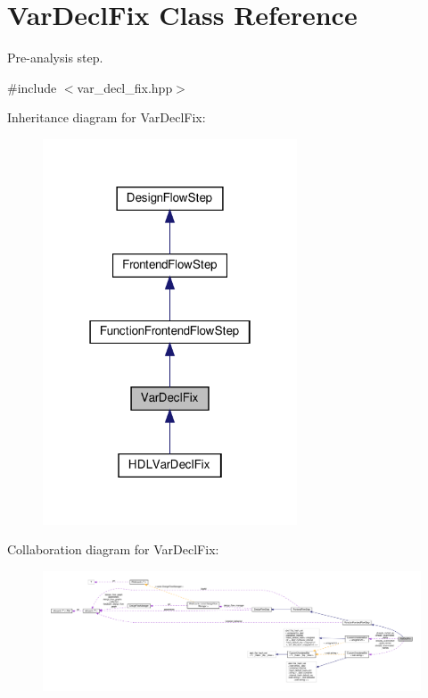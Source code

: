 \hypertarget{classVarDeclFix}{}\section{Var\+Decl\+Fix Class Reference}
\label{classVarDeclFix}


Pre-\/analysis step.  




{\ttfamily \#include $<$var\+\_\+decl\+\_\+fix.\+hpp$>$}



Inheritance diagram for Var\+Decl\+Fix\+:
\nopagebreak
\begin{figure}[H]
\begin{center}
\leavevmode
\includegraphics[width=214pt]{d2/d4b/classVarDeclFix__inherit__graph}
\end{center}
\end{figure}


Collaboration diagram for Var\+Decl\+Fix\+:
\nopagebreak
\begin{figure}[H]
\begin{center}
\leavevmode
\includegraphics[width=350pt]{df/d48/classVarDeclFix__coll__graph}
\end{center}
\end{figure}
